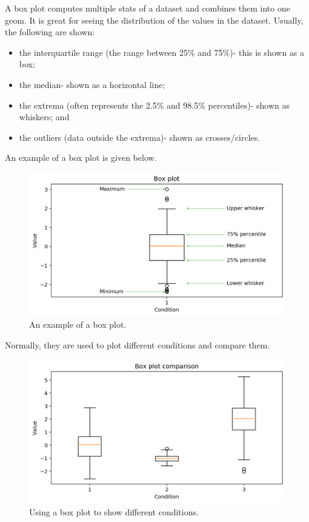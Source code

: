 \documentclass[a4paper, openany]{memoir}
\begin{document}
A box plot computes multiple stats of a dataset and combines them into one geom. It is great for seeing the distribution of the values in the dataset. Usually, the following are shown:
\begin{itemize}
    \item the interquartile range (the range between 25\% and 75\%)- this is shown as a box;
    \item the median- shown as a horizontal line;
    \item the extrema (often represents the 2.5\% and 98.5\% percentiles)- shown as whiskers; and
    \item the outliers (data outside the extrema)- shown as crosses/circles.
\end{itemize}
An example of a box plot is given below.
\begin{figure}[H]
    \centering
    \includegraphics[scale=0.5]{src/2.33 Gas Example Plot 17.png}
    \caption{An example of a box plot.}
\end{figure}
\noindent Normally, they are used to plot different conditions and compare them.
\begin{figure}[H]
    \centering
    \includegraphics[scale=0.5]{src/2.34 Gas Example Plot 18.png}
    \caption{Using a box plot to show different conditions.}
\end{figure}
\end{document}
